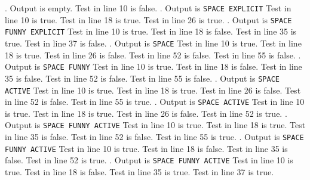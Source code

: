 \noindent\hrulefill{}. Output is empty.\quad \hrulefill\null
\smallskip
{}
\medskip
\noindent Test in line 10 is false.
\bigbreak
\noindent\hrulefill{}. Output is {\tt SPACE EXPLICIT}\quad \hrulefill\null
\smallskip
{}
\medskip
\noindent Test in line 10 is true. Test in line 18 is true. Test in line 26 is true.
\bigbreak
\noindent\hrulefill{}. Output is {\tt SPACE FUNNY EXPLICIT}\quad \hrulefill\null
\smallskip
{}
\medskip
\noindent Test in line 10 is true. Test in line 18 is false. Test in line 35 is true.
Test in line 37 is false.
\bigbreak
\noindent\hrulefill{}. Output is {\tt SPACE}\quad \hrulefill\null
\smallskip
{}
\medskip
\noindent Test in line 10 is true. Test in line 18 is true. Test in line 26 is false.
Test in line 52 is false.
Test in line 55 is false.
\bigbreak
\noindent\hrulefill{}. Output is {\tt SPACE FUNNY}\quad \hrulefill\null
\smallskip
{}
\medskip
\noindent Test in line 10 is true. Test in line 18 is false. Test in line 35 is false.
Test in line 52 is false.
Test in line 55 is false.
\bigbreak
\noindent\hrulefill{}. Output is {\tt SPACE ACTIVE}\quad \hrulefill\null
\smallskip
{}
\medskip
\noindent Test in line 10 is true. Test in line 18 is true. Test in line 26 is false.
Test in line 52 is false.
Test in line 55 is true.
\bigbreak
\noindent\hrulefill{}. Output is {\tt SPACE ACTIVE}\quad \hrulefill\null
\smallskip
{}
\medskip
\noindent Test in line 10 is true. Test in line 18 is true. Test in line 26 is false.
Test in line 52 is true.
\bigbreak
\noindent\hrulefill{}. Output is {\tt SPACE FUNNY ACTIVE}\quad \hrulefill\null
\smallskip
{}
\medskip
\noindent Test in line 10 is true. Test in line 18 is true. Test in line 35 is false.
Test in line 52 is false.
Test in line 55 is true.
\bigbreak
\noindent\hrulefill{}. Output is {\tt SPACE FUNNY ACTIVE}\quad \hrulefill\null
\smallskip
{}
\medskip
\noindent Test in line 10 is true. Test in line 18 is false. Test in line 35 is false.
Test in line 52 is true.
\bigbreak
\noindent\hrulefill{}. Output is {\tt SPACE FUNNY ACTIVE}\quad \hrulefill\null
\smallskip
{}
\medskip
\noindent Test in line 10 is true. Test in line 18 is false. Test in line 35 is true.
Test in line 37 is true.
\bye
